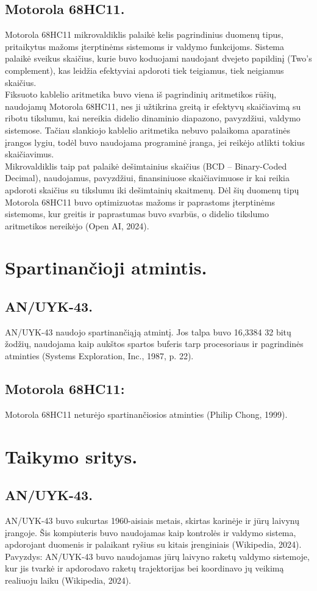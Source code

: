 \documentclass[a4paper,12pt]{article}
\begin{document}
\subsection{Motorola 68HC11.}
Motorola 68HC11 mikrovaldiklis palaikė kelis pagrindinius duomenų tipus, pritaikytus mažoms įterptinėms sistemoms ir valdymo funkcijoms. Sistema palaikė sveikus skaičius, kurie buvo koduojami naudojant dvejeto papildinį (Two’s complement), kas leidžia efektyviai apdoroti tiek teigiamus, tiek neigiamus skaičius.\\
Fiksuoto kablelio aritmetika buvo viena iš pagrindinių aritmetikos rūšių, naudojamų Motorola 68HC11, nes ji užtikrina greitą ir efektyvų skaičiavimą su ribotu tikslumu, kai nereikia didelio dinaminio diapazono, pavyzdžiui, valdymo sistemose. Tačiau slankiojo kablelio aritmetika nebuvo palaikoma aparatinės įrangos lygiu, todėl buvo naudojama programinė įranga, jei reikėjo atlikti tokius skaičiavimus.\\
Mikrovaldiklis taip pat palaikė dešimtainius skaičius (BCD – Binary-Coded Decimal), naudojamus, pavyzdžiui, finansiniuose skaičiavimuose ir kai reikia apdoroti skaičius su tikslumu iki dešimtainių skaitmenų. Dėl šių duomenų tipų Motorola 68HC11 buvo optimizuotas mažoms ir paprastoms įterptinėms sistemoms, kur greitis ir paprastumas buvo svarbūs, o didelio tikslumo aritmetikos nereikėjo (Open AI, 2024).

\section{Spartinančioji atmintis.}
\subsection{AN/UYK-43.}
AN/UYK-43 naudojo spartinančiąją atmintį. Jos talpa buvo 16,3384 32 bitų žodžių, naudojama kaip aukštos spartos buferis tarp procesoriaus ir pagrindinės atminties (Systems Exploration, Inc., 1987, p. 22).
\subsection{Motorola 68HC11:}
Motorola 68HC11 neturėjo spartinančiosios atminties (Philip Chong, 1999).

\section{Taikymo sritys.}
\subsection{AN/UYK-43.}
AN/UYK-43 buvo sukurtas 1960-aisiais metais, skirtas karinėje ir jūrų laivynų įrangoje. Šis kompiuteris buvo naudojamas kaip kontrolės ir valdymo sistema, apdorojant duomenis ir palaikant ryšius su kitais įrenginiais (Wikipedia, 2024). Pavyzdys: AN/UYK-43 buvo naudojamas jūrų laivyno raketų valdymo sistemoje, kur jis tvarkė ir apdorodavo raketų trajektorijas bei koordinavo jų veikimą realiuoju laiku (Wikipedia, 2024).
\end{document}
